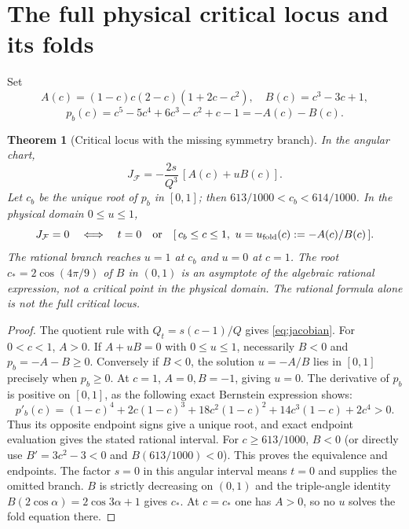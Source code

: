 \documentclass[11pt,a4paper]{article}
\newtheorem{theorem}{Theorem}[section]
\theoremstyle{definition}\newtheorem{definition}[theorem]{Definition}
\theoremstyle{remark}\newtheorem{remark}[theorem]{Remark}
\newcommand{\Map}{\mathcal F}\newcommand{\Pcore}{\mathcal P}
\begin{document}
\section{The full physical critical locus and its folds}
Set
\[
 A(c)=(1-c)c(2-c)(1+2c-c^2),\quad B(c)=c^3-3c+1,
\]
\[
 p_b(c)=c^5-5c^4+6c^3-c^2+c-1=-A(c)-B(c).
\]
\begin{theorem}[Critical locus with the missing symmetry branch]\label{thm:critical}
In the angular chart,
\begin{equation}\label{eq:jacobian}
 J_{\Map}=-\frac{2s}{Q^3}\,[A(c)+uB(c)].
\end{equation}
Let $c_b$ be the unique root of $p_b$ in $[0,1]$; then
$613/1000<c_b<614/1000$. In the physical domain $0\leq u\leq1$,
\begin{equation}\label{eq:critical}
 J_{\Map}=0\quad\Longleftrightarrow\quad
 t=0\quad\text{or}\quad
 [\,c_b\leq c\leq1,\ u=u_{\rm fold}(c):=-A(c)/B(c)\,].
\end{equation}
The rational branch reaches $u=1$ at $c_b$ and $u=0$ at $c=1$.
The root $c_*=2\cos(4\pi/9)$ of $B$ in $(0,1)$ is an asymptote of
the algebraic rational expression, not a critical point in the physical
domain. The rational formula alone is not the full critical locus.
\end{theorem}
\begin{proof}
The quotient rule with $Q_t=s(c-1)/Q$ gives
\eqref{eq:jacobian}. For $0<c<1$, $A>0$. If $A+uB=0$ with
$0\leq u\leq1$, necessarily $B<0$ and $p_b=-A-B\geq0$.
Conversely if $B<0$, the solution $u=-A/B$ lies in $[0,1]$ precisely
when $p_b\geq0$. At $c=1$, $A=0,B=-1$, giving $u=0$.
The derivative of $p_b$ is positive on $[0,1]$, as the following exact
Bernstein expression shows:
\[
 p'_b(c)=(1-c)^4+2c(1-c)^3+18c^2(1-c)^2+14c^3(1-c)+2c^4>0.
\]
Thus its opposite endpoint signs give a unique root, and exact endpoint
evaluation gives the stated rational interval. For $c\geq613/1000$,
$B<0$ (or directly use $B'=3c^2-3<0$ and $B(613/1000)<0$).
This proves the equivalence and endpoints. The factor $s=0$ in this
angular interval means $t=0$ and supplies the omitted branch.
$B$ is strictly decreasing on $(0,1)$ and the triple-angle identity
$B(2\cos\alpha)=2\cos3\alpha+1$ gives $c_*$.
At $c=c_*$ one has $A>0$, so no $u$ solves the fold equation there.
\end{proof}
\end{document}
